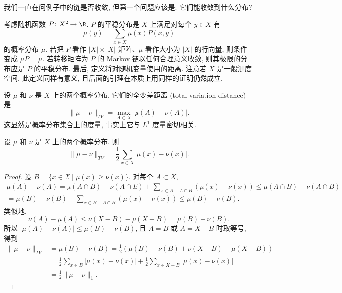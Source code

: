 我们一直在问例子中的链是否收敛, 但第一个问题应该是: 它们能收敛到什么分布?

\begin{definition}
\label{def:VI.1.6}
考虑随机函数 $P \colon X^2 \to \R$. $P$ 的平稳分布是 $X$ 上满足对每个 $y \in X$ 有
\[
\mu(y) = \sum_{x \in X}\mu(x)P(x, y)
\]
的概率分布 $\mu$.
若把 $P$ 看作 $|X| \times |X|$ 矩阵、$\mu$ 看作大小为 $|X|$ 的行向量, 则条件变成 $\mu P = \mu$.
若转移矩阵为 $P$ 的 Markov 链以任何合理意义收敛, 则其极限的分布应是 $P$ 的平稳分布.
最后, 定义将对随机变量使用的距离. 注意若 $X$ 是一般测度空间, 此定义同样有意义, 且后面的引理在本质上用同样的证明仍然成立.
\end{definition}

\begin{definition}
\label{def:VI.1.7}
设 $\mu$ 和 $\nu$ 是 $X$ 上的两个概率分布. 它们的全变差距离 (total variation distance) 是
\[
\|\mu - \nu\|_{TV} = \max_{A \subset X}|\mu(A) - \nu(A)|.
\]
这显然是概率分布集合上的度量, 事实上它与 $L^1$ 度量密切相关.
\end{definition}

\begin{lemma}[全变差距离的公式]
\label{lem:VI.1.8}
设 $\mu$ 和 $\nu$ 是 $X$ 上的两个概率分布. 则
\[
\|\mu - \nu\|_{TV} = \frac{1}{2}\sum_{x \in X}|\mu(x) - \nu(x)|.
\]
\end{lemma}

\begin{proof}
设 $B = \{x \in X \mid \mu(x) \geq \nu(x)\}$. 对每个 $A \subset X$,
\begin{multline*}
\mu(A) - \nu(A) = \mu(A \cap B) - \nu(A \cap B) + \sum_{x \in A - A \cap B}(\mu(x) - \nu(x)) \leq \mu(A \cap B) - \nu(A \cap B) \\
= \mu(B) - \nu(B) - \sum_{x \in B - A \cap B}(\mu(x) - \nu(x)) \leq \mu(B) - \nu(B).
\end{multline*}
类似地,
\[
\nu(A) - \mu(A) \leq \nu(X - B) - \mu(X - B) = \mu(B) - \nu(B).
\]
所以 $|\mu(A) - \nu(A)| \leq \mu(B) - \nu(B)$, 且 $A = B$ 或 $A = X - B$ 时取等号, 得到
\begin{align*}
\|\mu - \nu\|_{TV} &= \mu(B) - \nu(B) = \frac{1}{2}(\mu(B) - \nu(B) + \nu(X - B) - \mu(X - B)) \\
&= \frac{1}{2}\sum_{x \in B}|\mu(x) - \nu(x)| + \frac{1}{2}\sum_{x \in X - B}|\mu(x) - \nu(x)| \\
&= \frac{1}{2}\|\mu - \nu\|_1.
\end{align*}
\end{proof}


